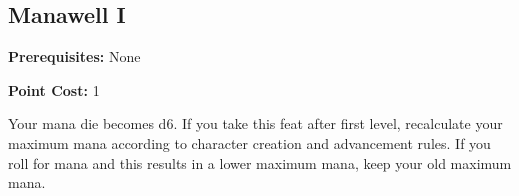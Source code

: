 \subsection*{Manawell I}\label{feat:manawell1}

\noindent
\textbf{Prerequisites:} None

\noindent
\textbf{Point Cost:} 1 

Your mana die becomes d6. If you take this feat after first level, recalculate
your maximum mana according to character creation and advancement rules. If you
roll for mana and this results in a lower maximum mana, keep your old maximum
mana.
